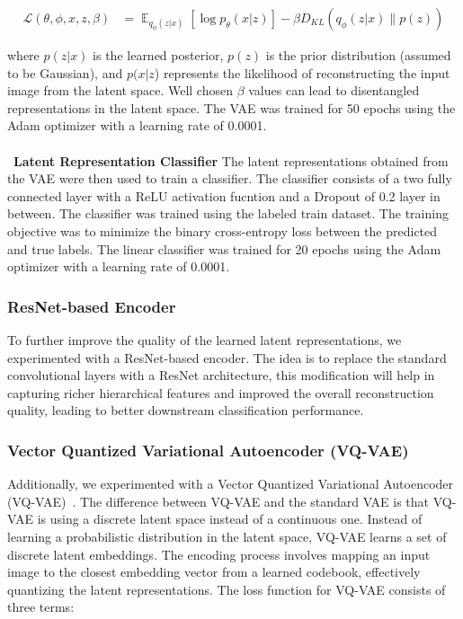 \documentclass{article}
\DeclareMathOperator{\E}{\mathbb{E}}
\begin{document}
\begin{align}
  \mathcal{L}(\theta, \phi, x, z, \beta) & = \E_{q_\phi(z|x)}[\log p_\theta(x|z)] - \beta D_{KL}(q_\phi(z|x)\| p(z))
\end{align}

where $p(z|x)$ is the learned posterior, $p(z)$ is the prior distribution
(assumed to be Gaussian), and $p(x|z$) represents the likelihood of
reconstructing the input image from the latent space. Well chosen $\beta$
values can lead to disentangled representations in the latent space. The VAE
was trained for 50 epochs using the Adam optimizer with a learning rate of
0.0001.
\\\
\\\
\textbf{Latent Representation Classifier}
The latent representations obtained from the VAE were then used to
train a classifier. The classifier consists of a two fully connected layer with
a ReLU activation fucntion and a Dropout of 0.2 layer in between. The classifier was
trained using the labeled train dataset. The training objective was to minimize
the binary cross-entropy loss between the predicted and true labels. The linear
classifier was trained for 20 epochs using the Adam optimizer with a learning
rate of 0.0001.

\subsubsection{ResNet-based Encoder}
To further improve the quality of the learned latent representations, we experimented with a ResNet-based encoder. The idea is to replace the standard convolutional layers with a ResNet architecture, this modification will help in capturing richer hierarchical features and improved the overall reconstruction quality, leading to better downstream classification performance.

\subsubsection{Vector Quantized Variational Autoencoder (VQ-VAE)}
Additionally, we experimented with a Vector Quantized Variational Autoencoder (VQ-VAE)~\cite{vq-vae}. The difference between VQ-VAE and the standard VAE is that VQ-VAE is using a discrete latent space instead of a continuous one. Instead of learning a probabilistic distribution in the latent space, VQ-VAE learns a set of discrete latent embeddings. The encoding process involves mapping an input image to the closest embedding vector from a learned codebook, effectively quantizing the latent representations. The loss function for VQ-VAE consists of three terms:
\end{document}
